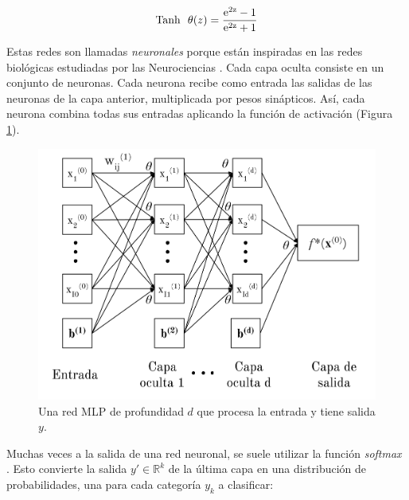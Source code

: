 \documentclass[spanish]{article}
\theoremstyle{definition}
\theoremstyle{remark}
\numberwithin{equation}{section}
\numberwithin{equation}{section} %
\begin{document}
\begin{equation}
\label{Eq_tanh}
\textrm{Tanh}\ \ \theta(z) =  \frac{\rm{e}^{2z}-1}{\rm{e}^{2z}+1}
\end{equation} \par
\par
Estas redes son llamadas \textit{neuronales} porque están inspiradas en las redes biológicas estudiadas por las Neurociencias \cite{mcculloch1943logical}. Cada capa oculta consiste en un conjunto de neuronas. Cada neurona recibe como entrada las salidas de las neuronas de la capa anterior, multiplicada por pesos sinápticos. Así, cada neurona combina todas sus entradas aplicando la función de activación (Figura \ref{fig:diagMLP}). \par
\begin{figure}[H]
 \centering
 \includegraphics[width=12cm]{img/MLP_Schema.png}
\caption[Diagrama MLP]{\footnotesize{ Una red MLP \cite{goodfellow2016deep} de profundidad $d$ que procesa la entrada  y tiene salida $y$.}} 
\label{fig:diagMLP}
\end{figure}
Muchas veces a la salida de una red neuronal, se suele utilizar la función \textit{softmax} \cite{bridle1990probabilistic}. Esto convierte la salida $y\prime \in  \mathbb{R}^{k}$ de la última capa en una distribución de probabilidades, una para cada categoría ${y}_k$ a clasificar:   \par
\end{document}
